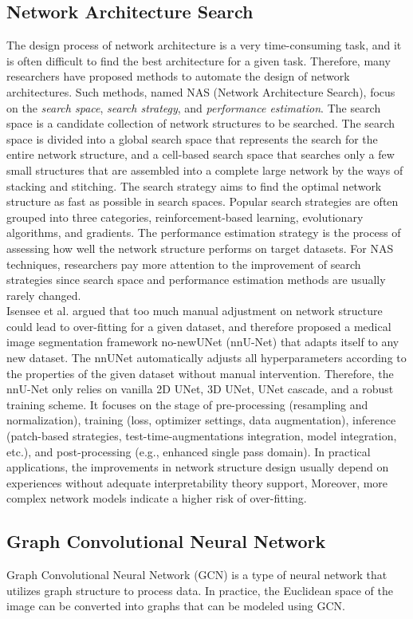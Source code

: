 \subsection{Network Architecture Search}
The design process of network architecture is a very time-consuming task, and
it is often difficult to find the best architecture for a given task. Therefore,
many researchers have proposed methods to automate the design of network
architectures. Such methods, named NAS (Network Architecture Search), focus on
the \emph{search space}, \emph{search strategy}, and \emph{performance
estimation}.
The search space is a candidate collection of network structures to be searched.
The search space is divided into a global search space that represents the
search for the entire network structure, and a cell-based search space that
searches only a few small structures that are assembled into a complete large network by the ways of stacking and stitching. The search strategy aims to find
the optimal network structure as fast as possible in search spaces. Popular
search strategies are often grouped into three categories, reinforcement-based
learning, evolutionary algorithms, and gradients. The performance estimation
strategy is the process of assessing how well the network structure performs on
target datasets. For NAS techniques, researchers pay more attention to the
improvement of search strategies since search space and performance estimation
methods are usually rarely changed.\\
Isensee et al. argued that too much manual adjustment on network structure could
lead to over-fitting for a given dataset, and therefore proposed a medical image
segmentation framework no-newUNet (nnU-Net) that adapts itself to any new
dataset. The nnUNet automatically adjusts all hyperparameters according to the
properties of the given dataset without manual intervention. Therefore, the
nnU-Net only relies on vanilla 2D UNet, 3D UNet, UNet cascade, and a robust
training scheme. It focuses on the stage of pre-processing (resampling and
normalization), training (loss, optimizer settings, data augmentation),
inference (patch-based strategies, test-time-augmentations integration, model
integration, etc.), and post-processing (e.g., enhanced single pass domain). In
practical applications, the improvements in network structure design usually
depend on experiences without adequate interpretability theory support,
Moreover, more complex network models indicate a higher risk of over-fitting.


\subsection{Graph Convolutional Neural Network}
Graph Convolutional Neural Network (GCN) is a type of neural network that
utilizes graph structure to process data. In practice, the Euclidean space of the
image can be converted into graphs that can be modeled using GCN.

